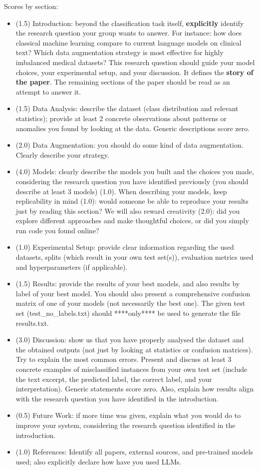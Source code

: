 \documentclass[twocolumn,10pt]{article}
\begin{document}
Scores by section:
\begin{itemize}
\item (1.5) Introduction: beyond the classification task itself, \textbf{explicitly} identify the research question your group wants to answer. For instance: how does classical machine learning compare to current language models on clinical text? Which data augmentation strategy is most effective for highly imbalanced medical datasets? This research question should guide your model choices, your experimental setup, and your discussion. It defines the \textbf{story of the paper}. The remaining sections of the paper should be read as an attempt to answer it.
\item (1.5) Data Analysis: describe the dataset (class distribution and relevant statistics); provide at least 2 concrete observations about patterns or anomalies you found by looking at the data. Generic descriptions score zero.
\item (2.0) Data Augmentation: you should do some kind of data augmentation. Clearly describe your strategy.
\item (4.0) Models: clearly describe the models you built and the choices you made, considering the research question you have identified previously (you should describe at least 3 models) (1.0). When describing your models, keep replicability in mind (1.0): would someone be able to reproduce your results just by reading this section? We will also reward creativity (2.0): did you explore different approaches and make thoughtful choices, or did you simply run code you found online?
\item (1.0) Experimental Setup: provide clear information regarding the used datasets, splits (which result in your own test set(s)), evaluation metrics used and hyperparameters (if applicable).
\item (1.5) Results: provide the results of your best models, and also results by label of your best model. You should also present a comprehensive confusion matrix of one of your models (not necessarily the best one). The given test set (test\_no\_labels.txt) should ****only**** be used to generate the file results.txt.
\item (3.0) Discussion: show us that you have properly analysed the dataset and the obtained outputs (not just by looking at statistics or confusion matrices). Try to explain the most common errors. Present and discuss at least 3 concrete examples of misclassified instances from your own test set (include the text excerpt, the predicted label, the correct label, and your interpretation). Generic statements score zero. Also, explain how results align with the research question you have identified in the introduction.
\item (0.5) Future Work: if more time was given, explain what you would do to improve your system, considering the research question identified in the introduction.
\item (1.0) References: Identify all papers, external sources, and pre-trained models used; also explicitly declare how have you used LLMs.
\end{itemize}
\end{document}
